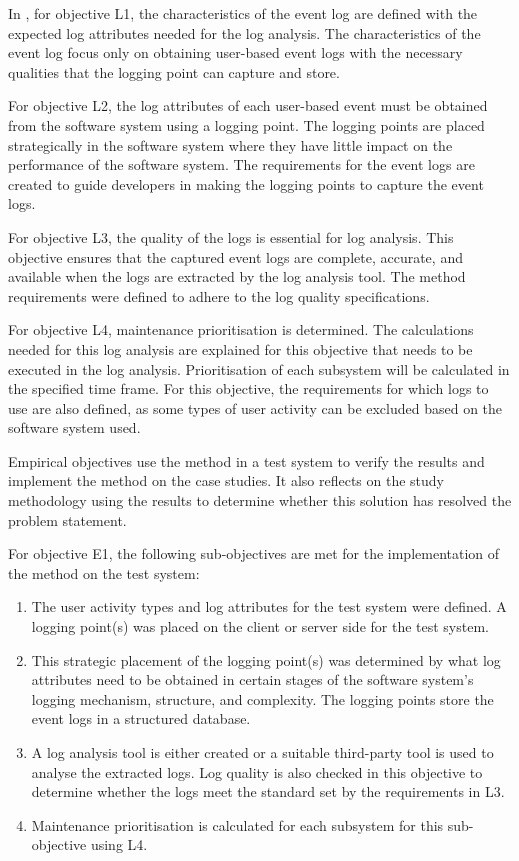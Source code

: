 \begin{enumerate}[label=\textbf{\Roman*.}]
    In , for objective L1, the characteristics of the event log are defined with the expected log attributes needed for the log analysis. The characteristics of the event log focus only on obtaining user-based event logs with the necessary qualities that the logging point can capture and store. \par For objective L2, the log attributes of each user-based event must be obtained from the software system using a logging point. The logging points are placed strategically in the software system where they have little impact on the performance of the software system. The requirements for the event logs are created to guide developers in making the logging points to capture the event logs. \par For objective L3, the quality of the logs is essential for log analysis. This objective ensures that the captured event logs are complete, accurate, and available when the logs are extracted by the log analysis tool. The method requirements were defined to adhere to the log quality specifications. \par For objective L4, maintenance prioritisation is determined. The calculations needed for this log analysis are explained for this objective that needs to be executed in the log analysis. Prioritisation of each subsystem will be calculated in the specified time frame. For this objective, the requirements for which logs to use are also defined, as some types of user activity can be excluded based on the software system used. \par Empirical objectives use the method in a test system to verify the results and implement the method on the case studies. It also reflects on the study methodology using the results to determine whether this solution has resolved the problem statement. \par For objective E1, the following sub-objectives are met for the implementation of the method on the test system:

	\begin{enumerate}
		\item The user activity types and log attributes for the test system were defined. A logging point(s) was placed on the client or server side for the test system.
		\item This strategic placement of the logging point(s) was determined by what log attributes need to be obtained in certain stages of the software system's logging mechanism, structure, and complexity. The logging points store the event logs in a structured database.
		\item A log analysis tool is either created or a suitable third-party tool is used to analyse the extracted logs. Log quality is also checked in this objective to determine whether the logs meet the standard set by the requirements in L3. 
		\item Maintenance prioritisation is calculated for each subsystem for this sub-objective using L4.
	\end{enumerate} 


\end{enumerate}
